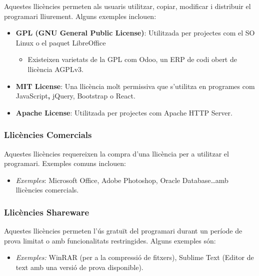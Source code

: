 \documentclass[
  12 pt,
  a4paper,
]{article}
\providecommand{\tightlist}{%
  \setlength{\itemsep}{0pt}\setlength{\parskip}{0pt}}
\begin{document}
Aquestes llicències permeten als usuaris utilitzar, copiar, modificar i
distribuir el programari lliurement. Alguns exemples inclouen:

\begin{itemize}
\item
  \textbf{GPL (GNU General Public License)}: Utilitzada per projectes
  com el SO Linux o el paquet LibreOffice

  \begin{itemize}
  \tightlist
  \item
    Existeixen varietats de la GPL com Odoo, un ERP de codi obert de
    llicència AGPLv3.
  \end{itemize}
\item
  \textbf{MIT License}: Una llicència molt permissiva que s'utilitza en
  programes com JavaScript\textbf{, }jQuery, Bootstrap o React.
\item
  \textbf{Apache License}: Utilitzada per projectes com Apache HTTP
  Server.
\end{itemize}

\subsubsection{Llicències Comercials}\label{llicuxe8ncies-comercials}

Aquestes llicències requereixen la compra d'una llicència per a
utilitzar el programari. Exemples comuns inclouen:

\begin{itemize}
\tightlist
\item
  \emph{Exemples}: Microsoft Office, Adobe Photoshop, Oracle
  Database\ldots amb llicències comercials.
\end{itemize}

\subsubsection{Llicències Shareware}\label{llicuxe8ncies-shareware}

Aquestes llicències permeten l'ús gratuït del programari durant un
període de prova limitat o amb funcionalitats restringides. Alguns
exemples són:

\begin{itemize}
\tightlist
\item
  \emph{Exemples:} WinRAR (per a la compressió de fitxers), Sublime Text
  (Editor de text amb una versió de prova disponible).
\end{itemize}
\end{document}
